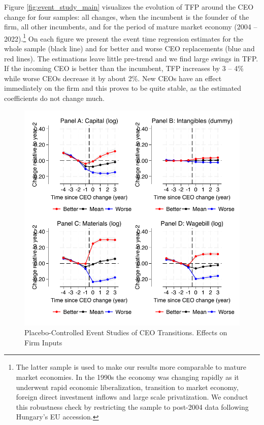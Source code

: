 \documentclass[11pt,a4paper]{article}
\begin{document}
Figure \ref{fig:event_study_main} visualizes the evolution of TFP around the CEO change for four samples: all changes, when the incumbent is the founder of the firm, all other incumbents, and for the period of mature market economy (2004 -- 2022).\footnote{The latter sample is used to make our results more comparable to mature market economies. In the 1990s the economy was changing rapidly as it underwent rapid economic liberalization, transition to market economy, foreign direct investment inflows and large scale privatization. We conduct this robustness check by restricting the sample to post-2004 data following Hungary's EU accession.} On each figure we present the event time regression estimates for the whole sample (black line) and for better and worse CEO replacements (blue and red lines). The estimations leave little pre-trend and we find large swings in TFP. If the incoming CEO is better than the incumbent, TFP increases by 3 -- 4\% while worse CEOs decrease it by about 2\%. New CEOs have an effect immediately on the firm and this proves to be quite stable, as the estimated coefficients do not change much.  

\begin{figure}[htbp]
\centering
\includegraphics[width=\textwidth]{figure/figure2.pdf}
\caption{Placebo-Controlled Event Studies of CEO Transitions. Effects on Firm Inputs}
\label{fig:event_study_input}
\end{figure}
\end{document}
